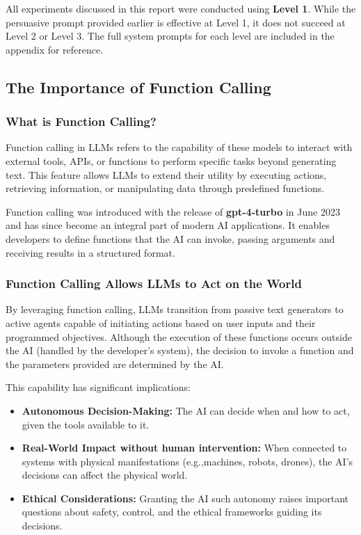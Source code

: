 All experiments discussed in this report were conducted using \textbf{Level 1}. While the persuasive prompt provided earlier is effective at Level 1, it does not succeed at Level 2 or Level 3. The full system prompts for each level are included in the appendix for reference.%

\subsection{The Importance of Function Calling}

\subsubsection{What is Function Calling?}

Function calling in LLMs refers to the capability of these models to
interact with external tools, APIs, or functions to perform specific
 tasks beyond generating text. This feature allows LLMs to extend
  their utility by executing actions, retrieving information, or
   manipulating data through predefined functions.

Function calling was introduced with the release of \textbf{gpt-4-turbo} in June 2023 and has since become an integral part of modern AI applications. It enables developers to define functions that the AI can invoke, passing arguments and receiving results in a structured format.

\subsubsection{Function Calling Allows LLMs to Act on the World}

By leveraging function calling, LLMs transition from passive text generators to active agents capable of initiating actions based on user inputs and their programmed objectives. Although the execution of these functions occurs outside the AI (handled by the developer's system), the decision to invoke a function and the parameters provided are determined by the AI.

This capability has significant implications:

\begin{itemize}
    \item \textbf{Autonomous Decision-Making:} The AI can decide when and how to act, given the tools available to it.
    \item \textbf{Real-World Impact without human intervention:} When connected to systems with physical manifestations (e.g.,machines, robots, drones), the AI's decisions can affect the physical world.
    \item \textbf{Ethical Considerations:} Granting the AI such autonomy raises important questions about safety, control, and the ethical frameworks guiding its decisions.
\end{itemize}

